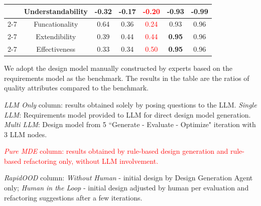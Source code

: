 \documentclass[pdflatex,sn-mathphys-num]{sn-jnl}%
\theoremstyle{thmstyleone}%
\theoremstyle{thmstyletwo}%
\theoremstyle{thmstylethree}%
\begin{document}
\begin{table}[!htb]
{\begin{threeparttable}
\begin{tabular}{|c|c|cc|c|cc|}
                            & Understandability        & \multicolumn{1}{c|}{-0.32}          & -0.17 & \multicolumn{1}{c|}{\textcolor{red}{-0.20}}          & \multicolumn{1}{c|}{-0.93}         & -0.99             \\ \cline{2-7} 
                            & Funcationality           & \multicolumn{1}{c|}{0.64}           & 0.36           & \multicolumn{1}{c|}{\textcolor{red}{0.24}}          & \multicolumn{1}{c|}{0.93}          & 0.96              \\ \cline{2-7} 
                            & Extendibility            & \multicolumn{1}{c|}{0.39}           & 0.44           & \multicolumn{1}{c|}{\textcolor{red}{0.44}}          & \multicolumn{1}{c|}{\textbf{0.95}}          & 0.96              \\ \cline{2-7} 
                            & Effectiveness            & \multicolumn{1}{c|}{0.33}           & 0.34           & \multicolumn{1}{c|}{\textcolor{red}{0.50}}          & \multicolumn{1}{c|}{\textbf{0.95}}          & 0.96              \\ \hline
\end{tabular}
    \begin{tablenotes}
    \footnotesize
         \item[1] We adopt the design model manually constructed by experts based on the requirements model as the benchmark. The results in the table are the ratios of quality attributes compared to the benchmark.
         \item[2] \textit{LLM Only} column: results obtained solely by posing questions to the LLM. \textit{Single LLM}: Requirements model provided to LLM for direct design model generation. \textit{Multi LLM}: Design model from 5 ``Generate - Evaluate - Optimize" iteration with 3 LLM nodes.
         \item[3] \textcolor{red}{\textit{Pure MDE} column: results obtained by rule-based design generation and rule-based refactoring only, without LLM involvement.}
         \item[4] \textit{RapidOOD} column: \textit{Without Human} - initial design by Design Generation Agent only; \textit{Human in the Loop} - initial design adjusted by human per evaluation and refactoring suggestions after a few iterations.
   \end{tablenotes}
  \end{threeparttable}}
\end{table}
\end{document}
